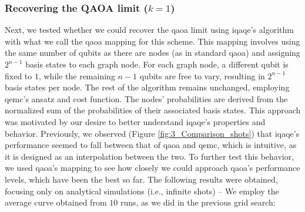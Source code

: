 






\subsubsection*{Recovering the QAOA limit ($k = 1$)}
\label{subsubsection:QAOA-Limit_iQAQE}


Next, we tested whether we could recover the \acrshort{qaoa} limit using \acrshort{iqaqe}'s algorithm with what we call the \acrshort{qaoa} mapping for this scheme. This mapping involves using the same number of qubits as there are nodes (as in standard \acrshort{qaoa}) and assigning $2^{n-1}$ basis states to each graph node. For each graph node, a different qubit is fixed to $1$, while the remaining $n - 1$ qubits are free to vary, resulting in $2^{n-1}$ basis states per node. The rest of the algorithm remains unchanged, employing \acrshort{qemc}'s ansatz and cost function. The nodes' probabilities are derived from the normalized sum of the probabilities of their associated basis states. This approach was motivated by our desire to better understand \acrshort{iqaqe}'s properties and behavior. Previously, we observed (Figure \ref{fig:3_Comparison_shots}) that \acrshort{iqaqe}'s performance seemed to fall between that of \acrshort{qaoa} and \acrshort{qemc}, which is intuitive, as it is designed as an interpolation between the two. To further test this behavior, we used \acrshort{qaoa}'s mapping to see how closely we could approach \acrshort{qaoa}'s performance levels, which have been the best so far. The following results were obtained, focusing only on analytical simulations (i.e., infinite shots) – We employ the average curve obtained from $10$ runs, as we did in the previous grid search:

